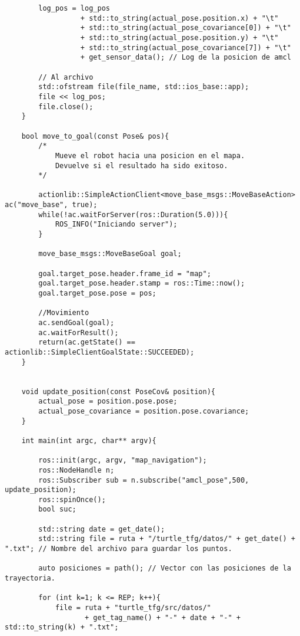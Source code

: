 \begin{lstlisting}
        log_pos = log_pos
                  + std::to_string(actual_pose.position.x) + "\t"
                  + std::to_string(actual_pose_covariance[0]) + "\t"
                  + std::to_string(actual_pose.position.y) + "\t"
                  + std::to_string(actual_pose_covariance[7]) + "\t"
                  + get_sensor_data(); // Log de la posicion de amcl
    
        // Al archivo
        std::ofstream file(file_name, std::ios_base::app);
        file << log_pos;
        file.close();
    }
    
    bool move_to_goal(const Pose& pos){
        /*
            Mueve el robot hacia una posicion en el mapa.
            Devuelve si el resultado ha sido exitoso.
        */
        
        actionlib::SimpleActionClient<move_base_msgs::MoveBaseAction> ac("move_base", true);
        while(!ac.waitForServer(ros::Duration(5.0))){
            ROS_INFO("Iniciando server");
        }
        
        move_base_msgs::MoveBaseGoal goal;
        
        goal.target_pose.header.frame_id = "map";
        goal.target_pose.header.stamp = ros::Time::now();
        goal.target_pose.pose = pos;
    
        //Movimiento
        ac.sendGoal(goal);
        ac.waitForResult();
        return(ac.getState() == actionlib::SimpleClientGoalState::SUCCEEDED);
    }
    
    
    void update_position(const PoseCov& position){
        actual_pose = position.pose.pose;
        actual_pose_covariance = position.pose.covariance;
    }
    
    int main(int argc, char** argv){
    
        ros::init(argc, argv, "map_navigation");
        ros::NodeHandle n;
        ros::Subscriber sub = n.subscribe("amcl_pose",500, update_position);
        ros::spinOnce();
        bool suc;
    
        std::string date = get_date(); 
        std::string file = ruta + "/turtle_tfg/datos/" + get_date() + ".txt"; // Nombre del archivo para guardar los puntos.
    
        auto posiciones = path(); // Vector con las posiciones de la trayectoria.
        
        for (int k=1; k <= REP; k++){
            file = ruta + "turtle_tfg/src/datos/" 
                   + get_tag_name() + "-" + date + "-" + std::to_string(k) + ".txt"; 
    

\end{lstlisting}
